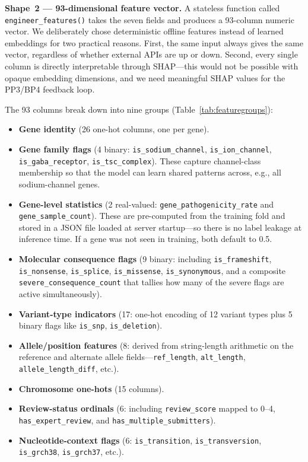 \documentclass[conference]{IEEEtran}
\begin{document}
\textbf{Shape~2 --- 93-dimensional feature vector.}
A stateless function called \texttt{engineer\_features()} takes
the seven fields and produces a 93-column numeric vector. We
deliberately chose deterministic offline features instead of
learned embeddings for two practical reasons. First, the same
input always gives the same vector, regardless of whether external
APIs are up or down. Second, every single column is directly
interpretable through SHAP---this would not be possible with
opaque embedding dimensions, and we need meaningful SHAP values
for the PP3/BP4 feedback loop.

The 93 columns break down into nine groups
(Table~\ref{tab:featuregroups}):

\begin{itemize}
  \item \textbf{Gene identity} (26 one-hot columns, one per gene).
  \item \textbf{Gene family flags} (4 binary:
        \texttt{is\_sodium\_channel}, \texttt{is\_ion\_channel},
        \texttt{is\_gaba\_receptor}, \texttt{is\_tsc\_complex}).
        These capture channel-class membership so that the model
        can learn shared patterns across, e.g., all sodium-channel
        genes.
  \item \textbf{Gene-level statistics} (2 real-valued:
        \texttt{gene\_pathogenicity\_rate} and
        \texttt{gene\_sample\_count}). These are pre-computed from
        the training fold and stored in a JSON file loaded at
        server startup---so there is no label leakage at inference
        time. If a gene was not seen in training, both default
        to 0.5.
  \item \textbf{Molecular consequence flags} (9 binary: including
        \texttt{is\_frameshift}, \texttt{is\_nonsense},
        \texttt{is\_splice}, \texttt{is\_missense},
        \texttt{is\_synonymous}, and a composite
        \texttt{severe\_consequence\_count} that tallies how many
        of the severe flags are active simultaneously).
  \item \textbf{Variant-type indicators} (17: one-hot encoding of
        12 variant types plus 5 binary flags like \texttt{is\_snp},
        \texttt{is\_deletion}).
  \item \textbf{Allele/position features} (8: derived from
        string-length arithmetic on the reference and alternate
        allele fields---\texttt{ref\_length}, \texttt{alt\_length},
        \texttt{allele\_length\_diff}, etc.).
  \item \textbf{Chromosome one-hots} (15 columns).
  \item \textbf{Review-status ordinals} (6: including
        \texttt{review\_score} mapped to 0--4,
        \texttt{has\_expert\_review}, and
        \texttt{has\_multiple\_submitters}).
  \item \textbf{Nucleotide-context flags} (6:
        \texttt{is\_transition}, \texttt{is\_transversion},
        \texttt{is\_grch38}, \texttt{is\_grch37}, etc.).
\end{itemize}
\end{document}
